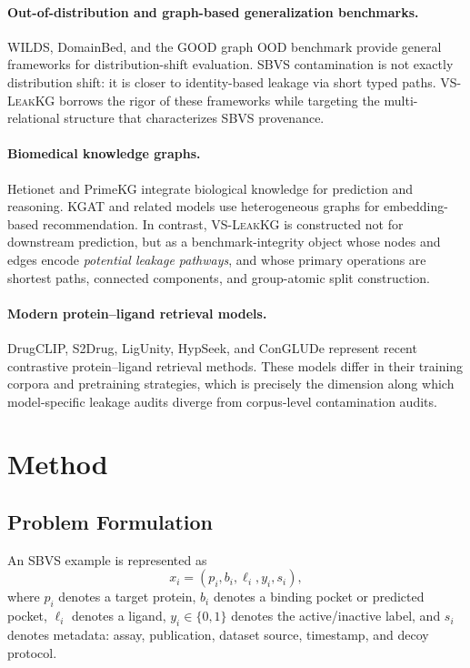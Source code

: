 \documentclass[11pt]{article}
\begin{document}
\paragraph{Out-of-distribution and graph-based generalization benchmarks.}
WILDS, DomainBed, and the GOOD graph OOD benchmark provide general frameworks for distribution-shift evaluation. SBVS contamination is not exactly distribution shift: it is closer to identity-based leakage via short typed paths. \textsc{VS-LeakKG} borrows the rigor of these frameworks while targeting the multi-relational structure that characterizes SBVS provenance.

\paragraph{Biomedical knowledge graphs.}
Hetionet and PrimeKG integrate biological knowledge for prediction and reasoning. KGAT and related models use heterogeneous graphs for embedding-based recommendation. In contrast, \textsc{VS-LeakKG} is constructed not for downstream prediction, but as a benchmark-integrity object whose nodes and edges encode \emph{potential leakage pathways}, and whose primary operations are shortest paths, connected components, and group-atomic split construction.

\paragraph{Modern protein--ligand retrieval models.}
DrugCLIP, S2Drug, LigUnity, HypSeek, and ConGLUDe represent recent contrastive protein--ligand retrieval methods. These models differ in their training corpora and pretraining strategies, which is precisely the dimension along which model-specific leakage audits diverge from corpus-level contamination audits.

\section{Method}

\subsection{Problem Formulation}

An SBVS example is represented as
\[
x_i = (p_i, b_i, \ell_i, y_i, s_i),
\]
where \(p_i\) denotes a target protein, \(b_i\) denotes a binding pocket or predicted pocket, \(\ell_i\) denotes a ligand, \(y_i \in \{0,1\}\) denotes the active/inactive label, and \(s_i\) denotes metadata: assay, publication, dataset source, timestamp, and decoy protocol.
\end{document}
